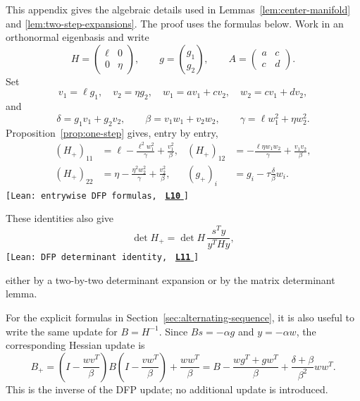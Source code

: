 \documentclass[11pt]{article}
\newcommand{\leanLinkText}[1]{%
  \underline{\textbf{#1}}%
}
\newcommand{\leanSnapshot}{e308927f5b7930bdd002f0c0e42b9d112ad821cb}
\newcommand{\leanClaimTag}[3]{%
  {\footnotesize\texttt{[Lean: #1, }}%
  \href{https://github.com/imathwy/DFP_wolfe_local/blob/\leanSnapshot/#2?plain=1\#L#3}%
    {\leanLinkText{\footnotesize\texttt{L#3}}}%
  {\footnotesize\texttt{]}}\enspace
}
\begin{document}
This appendix gives the algebraic details used in
Lemmas~\ref{lem:center-manifold} and \ref{lem:two-step-expansions}.  The proof
uses the formulas below.  Work in an orthonormal eigenbasis and write
\[
H=\begin{pmatrix}\ell&0\\0&\eta\end{pmatrix},\qquad
g=\binom{g_1}{g_2},\qquad
A=\begin{pmatrix}a&c\\c&d\end{pmatrix}.
\]
Set
\[
v_1=\ell g_1,\quad v_2=\eta g_2,\quad
w_1=av_1+cv_2,\quad w_2=cv_1+dv_2,
\]
and
\[
\delta=g_1v_1+g_2v_2,\qquad
\beta=v_1w_1+v_2w_2,
\qquad \gamma=\ell w_1^2+\eta w_2^2.
\]
Proposition~\ref{prop:one-step} gives, entry by entry,
\begin{align}
(H_+)_{11}&=\ell-\frac{\ell^2w_1^2}{\gamma}
                    +\frac{v_1^2}{\beta},
&
(H_+)_{12}&=-\frac{\ell\eta w_1w_2}{\gamma}
                    +\frac{v_1v_2}{\beta},
\label{eq:appendix-H-entries}\\
(H_+)_{22}&=\eta-\frac{\eta^2w_2^2}{\gamma}
                    +\frac{v_2^2}{\beta},
&
(g_+)_i&=g_i-\tau\frac{\delta}{\beta}w_i.
\nonumber
\end{align}
\leanClaimTag{entrywise DFP formulas}{DFPWolfe/A_uniformly_convex_counterexample_to_global_convergence_of_DFP_under_weak_Wolfe_/Appendix_Lemma_A_1_Entrywise_one_step_formulas.lean}{10}
These identities also give
\begin{equation}\label{eq:dfp-determinant}
\det H_+=\det H\,\frac{s^Ty}{y^THy},
\end{equation}
\leanClaimTag{DFP determinant identity}{DFPWolfe/A_uniformly_convex_counterexample_to_global_convergence_of_DFP_under_weak_Wolfe_/Appendix_Lemma_A_2_Determinant_identity_for_the_one_step_map.lean}{11}
either by a two-by-two determinant expansion or by the matrix determinant
lemma.

For the explicit formulas in Section~\ref{sec:alternating-sequence}, it is
also useful to write the same update for $B=H^{-1}$.  Since
$Bs=-\alpha g$ and $y=-\alpha w$, the corresponding Hessian update is
\begin{equation}\label{eq:appendix-B-update}
B_+
=\left(I-\frac{wv^T}{\beta}\right)
B\left(I-\frac{vw^T}{\beta}\right)
+\frac{ww^T}{\beta}
=B-\frac{wg^T+gw^T}{\beta}
+\frac{\delta+\beta}{\beta^2}ww^T.
\end{equation}
This is the inverse of the DFP update; no additional update is introduced.
\end{document}
